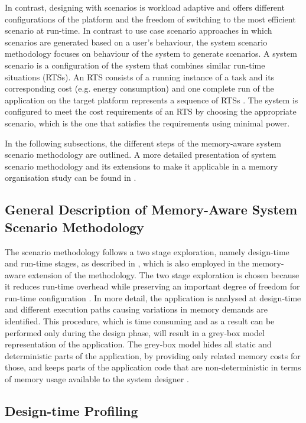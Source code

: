 \documentclass[a4paper,conference]{IEEEtran}
\begin{document}
In contrast, designing with scenarios is workload adaptive and offers different configurations of the platform and the freedom of switching to the most efficient scenario at run-time. In contrast to use case scenario approaches in which scenarios are generated based on a user's behaviour, the system scenario methodology focuses on behaviour of the system to generate scenarios. A system scenario is a configuration of the system that combines similar run-time situations (RTSs). An RTS consists of a running instance of a task and its corresponding cost (e.g. energy consumption) and one complete run of the application on the target platform represents a sequence of RTSs \cite{Elena2010}. The system is configured to meet the cost requirements of an RTS by choosing the appropriate scenario, which is the one that satisfies the requirements using minimal power.

In the following subsections, the different steps of the memory-aware system scenario methodology are outlined. A more detailed presentation of system scenario methodology and its extensions to make it applicable in a memory organisation study can be found in \cite{Fil12}.

\subsection{General Description of Memory-Aware System Scenario Methodology}

The scenario methodology follows a two stage exploration, namely design-time and run-time stages, as described in \cite{Gheorghita2007}, which is also employed in the memory-aware extension of the methodology. The two stage exploration is chosen because it reduces run-time overhead while preserving an important degree of freedom for run-time configuration \cite{tcm}. In more detail, the application is analysed at design-time and different execution paths causing variations in memory demands are identified. This procedure, which is time consuming and as a result can be performed only during the design phase, will result in a grey-box model representation of the application. The grey-box model hides all static and deterministic parts of the application, by providing only related memory costs for those, and keeps parts of the application code that are non-deterministic in terms of memory usage available to the system designer \cite{graybox}. 


\subsection{Design-time Profiling}
\end{document}
